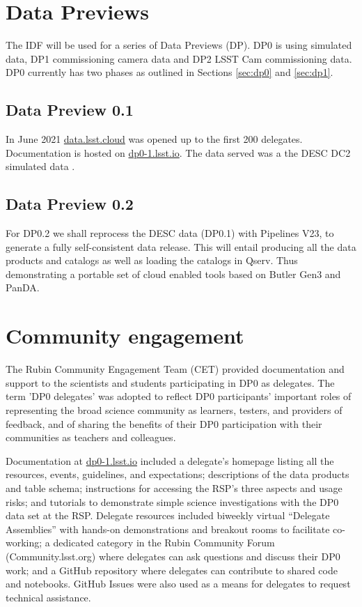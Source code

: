 \section {Data Previews}
The IDF will be used for a series of Data Previews (DP). DP0 is using simulated data, DP1 commissioning camera data
and DP2 LSST Cam commissioning data. DP0 currently has two phases as outlined in Sections \ref{sec:dp0} and \ref {sec:dp1}.

\subsection{Data Preview 0.1}\label{sec:dp01}
In June 2021  \href{  data.lsst.cloud}{data.lsst.cloud} was opened up to the first 200 delegates.
Documentation is hosted on \href{ dp0-1.lsst.io}{ dp0-1.lsst.io}.
The data served was a the DESC DC2 simulated data \citep{arXiv:2010.05926}.



\subsection{Data Preview 0.2}\label{sec:dp02}
For DP0.2 we shall reprocess the DESC data (DP0.1) with Pipelines V23, to generate a fully self-consistent data release.
This will entail producing all the data products and catalogs as well as loading the  catalogs in Qserv.
Thus demonstrating a portable set of cloud enabled tools based on Butler Gen3 and PanDA.


\section{Community engagement }
The Rubin Community Engagement Team (CET) provided documentation and support to the scientists and students participating in DP0 as delegates.
The term 'DP0 delegates' was adopted to reflect DP0 participants’ important roles of representing the broad science community as learners, testers, and providers of feedback, and of sharing the benefits of their DP0 participation with their communities as teachers and colleagues.

Documentation at \url{dp0-1.lsst.io} included a delegate's homepage listing all the resources, events, guidelines, and expectations; descriptions of the data products and table schema; instructions for accessing the RSP's three aspects and usage risks; and tutorials to demonstrate simple science investigations with the DP0 data set at the RSP. 
Delegate resources included biweekly virtual “Delegate Assemblies” with hands-on demonstrations and breakout rooms to facilitate co-working; a dedicated category in the Rubin Community Forum (Community.lsst.org) where delegates can ask questions and discuss their DP0 work; and a GitHub repository where delegates can contribute to shared code and notebooks.
GitHub Issues were also used as a means for delegates to request technical assistance.

